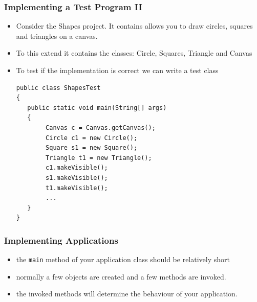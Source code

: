 \documentclass{beamer}
\begin{document}
\begin{frame}[fragile]
\frametitle{Implementing a Test Program II}
\begin{itemize}
\item Consider the Shapes project. It contains allows you to draw circles, squares and triangles on a canvas. 
\item To this extend it contains the classes: Circle, Squares, Triangle and Canvas
\item To test if the implementation is correct we can write a test class
\begin{lstlisting}
public class ShapesTest
{
   public static void main(String[] args)
   {
        Canvas c = Canvas.getCanvas();
        Circle c1 = new Circle();
        Square s1 = new Square();
        Triangle t1 = new Triangle();
        c1.makeVisible();
        s1.makeVisible();
        t1.makeVisible();
        ...
   }
}
\end{lstlisting}
\end{itemize}
\end{frame}

\begin{frame}[fragile]
\frametitle{Implementing Applications}
\begin{itemize}
\item the \lstinline!main! method of your application class should be relatively short
\item normally a few objects are created and a few methods are invoked. 
\item the invoked methods will determine the behaviour of your application.
\end{itemize}
\end{frame}
\end{document}
